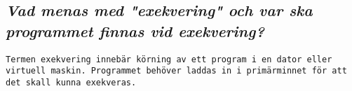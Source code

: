 \documentclass[../main.tex]{subfiles}
\begin{document}
\subsection{\textit{Vad menas med "exekvering" och var ska programmet finnas vid exekvering?}}

\texttt{Termen exekvering innebär körning av ett program i en dator eller virtuell maskin. Programmet behöver laddas in i primärminnet för att det skall kunna exekveras.}
\end{document}
